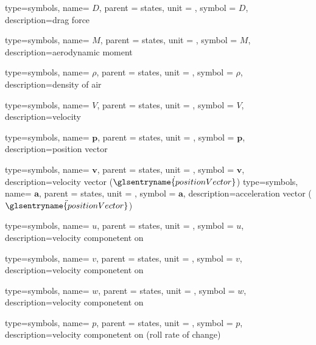 {type=symbols,
	name= \ensuremath{D},
	parent = {states},
	unit = \unexpanded{\si{\newton}},
	symbol = \ensuremath{D},
	description={drag force}
}

{type=symbols,
	name= \ensuremath{M},
	parent = {states},
	unit = \unexpanded{\si{\newton\meter}},
	symbol = \ensuremath{M},
	description={aerodynamic moment}
}

{type=symbols,
	name= \ensuremath{\rho},
	parent = {states},
	unit = \unexpanded{\si{\kilogram\per\meter\cubed}},
	symbol = \ensuremath{\rho},
	description={density of air}
}

{type=symbols,
	name= \ensuremath{V},
	parent = {states},
	unit = \unexpanded{\si{\meter\per\second}},
	symbol = \ensuremath{V},
	description={velocity}
}

{type=symbols,
	name= \ensuremath{\mathbf{p}},
	parent = {states},
	unit = \unexpanded{\si{\meter}},
	symbol = \ensuremath{\mathbf{p}},
	description={position vector}
}

{type=symbols,
	name= \ensuremath{\mathbf{v}},
	parent = {states},
	unit = \unexpanded{\si{\meter\per\second}},
	symbol = \ensuremath{\mathbf{v}},
	description={velocity vector ($\dot{\glsentryname{positionVector}}$)}
}
{type=symbols,
	name= \ensuremath{\mathbf{a}},
	parent = {states},
	unit = \unexpanded{\si{\meter\per\second\squared}},
	symbol = \ensuremath{\mathbf{a}},
	description={acceleration vector ($\ddot{\glsentryname{positionVector}}$)}
}


{type=symbols,
	name= \ensuremath{u},
	parent = {states},
	unit = \unexpanded{\si{\meter\per\second}},
	symbol = \ensuremath{u},
	description={velocity componetent on }
}

{type=symbols,
	name= \ensuremath{v},
	parent = {states},
	unit = \unexpanded{\si{\meter\per\second}},
	symbol = \ensuremath{v},
	description={velocity componetent on }
}

{type=symbols,
	name= \ensuremath{w},
	parent = {states},
	unit = \unexpanded{\si{\meter\per\second}},
	symbol = \ensuremath{w},
	description={velocity componetent on }
}

{type=symbols,
	name= \ensuremath{p},
	parent = {states},
	unit = \unexpanded{\si{\radian\per\second}},
	symbol = \ensuremath{p},
	description={velocity componetent on  (roll rate of change)}
}

